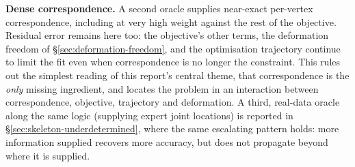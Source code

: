 \textbf{Dense correspondence.} A second oracle supplies near-exact per-vertex
correspondence, including at very high weight against the rest of the
objective. Residual error remains here too: the objective's other terms, the
deformation freedom of \S\ref{sec:deformation-freedom}, and the optimisation
trajectory continue to limit the fit even when correspondence is no longer
the constraint. This rules out the simplest reading of this report's central
theme, that correspondence is the \emph{only} missing ingredient, and
locates the problem in an interaction between correspondence, objective,
trajectory and deformation. A third, real-data oracle along the same logic
(supplying expert joint locations) is reported in
\S\ref{sec:skeleton-underdetermined}, where the same escalating pattern holds:
more information supplied recovers more accuracy, but does not propagate
beyond where it is supplied.
